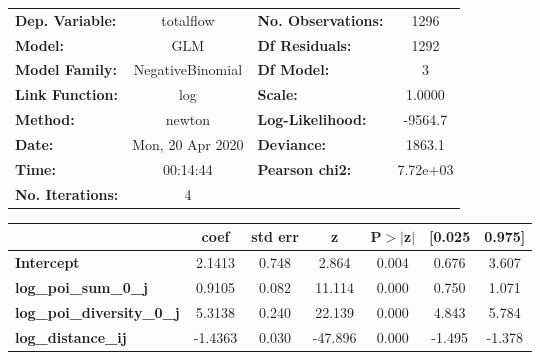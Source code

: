 \begin{center}
\begin{tabular}{lclc}
\toprule
\textbf{Dep. Variable:}            &    totalflow     & \textbf{  No. Observations:  } &     1296    \\
\textbf{Model:}                    &       GLM        & \textbf{  Df Residuals:      } &     1292    \\
\textbf{Model Family:}             & NegativeBinomial & \textbf{  Df Model:          } &        3    \\
\textbf{Link Function:}            &       log        & \textbf{  Scale:             } &    1.0000   \\
\textbf{Method:}                   &      newton      & \textbf{  Log-Likelihood:    } &   -9564.7   \\
\textbf{Date:}                     & Mon, 20 Apr 2020 & \textbf{  Deviance:          } &    1863.1   \\
\textbf{Time:}                     &     00:14:44     & \textbf{  Pearson chi2:      } &  7.72e+03   \\
\textbf{No. Iterations:}           &        4         & \textbf{                     } &             \\
\bottomrule
\end{tabular}
\begin{tabular}{lcccccc}
                                   & \textbf{coef} & \textbf{std err} & \textbf{z} & \textbf{P$> |$z$|$} & \textbf{[0.025} & \textbf{0.975]}  \\
\midrule
\textbf{Intercept}                 &       2.1413  &        0.748     &     2.864  &         0.004        &        0.676    &        3.607     \\
\textbf{log\_poi\_sum\_0\_j}       &       0.9105  &        0.082     &    11.114  &         0.000        &        0.750    &        1.071     \\
\textbf{log\_poi\_diversity\_0\_j} &       5.3138  &        0.240     &    22.139  &         0.000        &        4.843    &        5.784     \\
\textbf{log\_distance\_ij}         &      -1.4363  &        0.030     &   -47.896  &         0.000        &       -1.495    &       -1.378     \\
\bottomrule
\end{tabular}
\end{center}